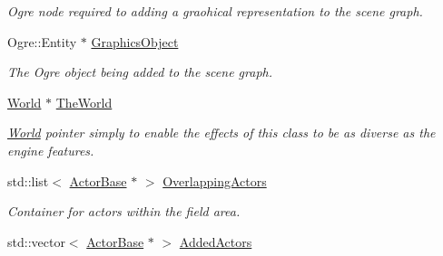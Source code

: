 \begin{DoxyCompactItemize}
\begin{DoxyCompactList}\small\item\em Ogre node required to adding a graohical representation to the scene graph. \item\end{DoxyCompactList}\item 
\hypertarget{classphys_1_1AreaEffect_a31b755c85d318438e42e300de56d2e5c}{
Ogre::Entity $\ast$ \hyperlink{classphys_1_1AreaEffect_a31b755c85d318438e42e300de56d2e5c}{GraphicsObject}}
\label{classphys_1_1AreaEffect_a31b755c85d318438e42e300de56d2e5c}

\begin{DoxyCompactList}\small\item\em The Ogre object being added to the scene graph. \item\end{DoxyCompactList}\item 
\hypertarget{classphys_1_1AreaEffect_a3008e8e90236141ca4c21a9580e6f5de}{
\hyperlink{classphys_1_1World}{World} $\ast$ \hyperlink{classphys_1_1AreaEffect_a3008e8e90236141ca4c21a9580e6f5de}{TheWorld}}
\label{classphys_1_1AreaEffect_a3008e8e90236141ca4c21a9580e6f5de}

\begin{DoxyCompactList}\small\item\em \hyperlink{classphys_1_1World}{World} pointer simply to enable the effects of this class to be as diverse as the engine features. \item\end{DoxyCompactList}\item 
\hypertarget{classphys_1_1AreaEffect_a45834591f0ea49ba6657ce58d070ee9b}{
std::list$<$ \hyperlink{classphys_1_1ActorBase}{ActorBase} $\ast$ $>$ \hyperlink{classphys_1_1AreaEffect_a45834591f0ea49ba6657ce58d070ee9b}{OverlappingActors}}
\label{classphys_1_1AreaEffect_a45834591f0ea49ba6657ce58d070ee9b}

\begin{DoxyCompactList}\small\item\em Container for actors within the field area. \item\end{DoxyCompactList}\item 
\hypertarget{classphys_1_1AreaEffect_a5bd2ad15db98ecc140a8bf2fee8d0c1f}{
std::vector$<$ \hyperlink{classphys_1_1ActorBase}{ActorBase} $\ast$ $>$ \hyperlink{classphys_1_1AreaEffect_a5bd2ad15db98ecc140a8bf2fee8d0c1f}{AddedActors}}
\label{classphys_1_1AreaEffect_a5bd2ad15db98ecc140a8bf2fee8d0c1f}


\end{DoxyCompactItemize}
